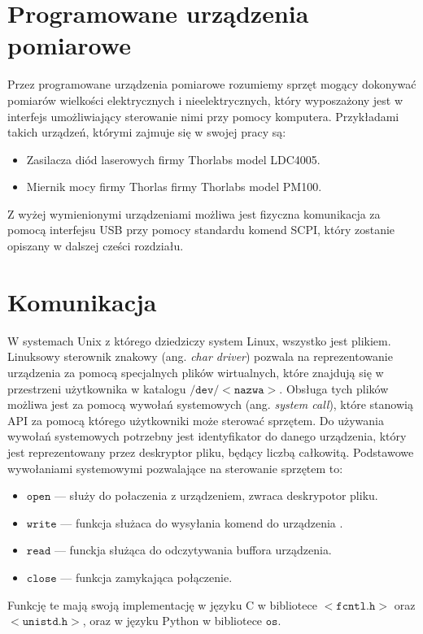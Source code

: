 \section{Programowane urządzenia pomiarowe}
Przez programowane urządzenia pomiarowe rozumiemy sprzęt mogący dokonywać pomiarów wielkości elektrycznych i nieelektrycznych,
który wyposzażony jest w interfejs umożliwiający sterowanie nimi przy pomocy komputera. Przykładami takich urządzeń, którymi zajmuje się w swojej pracy są:
\begin{itemize}
\item Zasilacza diód laserowych firmy Thorlabs model LDC4005.
\item Miernik mocy firmy Thorlas firmy Thorlabs model PM100.
\end{itemize}
Z wyżej wymienionymi urządzeniami możliwa jest fizyczna komunikacja za pomocą interfejsu USB przy pomocy standardu komend SCPI,
który zostanie opiszany w dalszej cześci rozdziału.

\section{Komunikacja}
W systemach Unix z którego dziedziczy system Linux, wszystko jest plikiem. Linuksowy sterownik znakowy (ang. \textit{char driver})
pozwala na reprezentowanie urządzenia za pomocą specjalnych plików wirtualnych, które znajdują się w przestrzeni
użytkownika w katalogu $\mathtt{/dev/<nazwa>}$. Obsługa tych plików możliwa jest za pomocą wywołań systemowych (ang. \textit{system call}),
które stanowią API za pomocą którego użytkowniki może sterować sprzętem. Do używania wywołań systemowych potrzebny jest
identyfikator do danego urządzenia, który jest reprezentowany przez deskryptor pliku, będący liczbą całkowitą.
Podstawowe wywołaniami systemowymi pozwalające na sterowanie sprzętem to:
\begin{itemize}
\item $\mathtt{open}$ --- służy do połaczenia z urządzeniem, zwraca deskrypotor pliku.
\item $\mathtt{write}$ --- funkcja służaca do wysyłania komend do urządzenia .
\item $\mathtt{read}$ --- funckja służąca do odczytywania buffora urządzenia.
\item $\mathtt{close}$ --- funkcja zamykająca połączenie.
\end{itemize}
Funkcję te mają swoją implementację w języku C w bibliotece $<\mathtt{fcntl.h}>$ oraz $<\mathtt{unistd.h}>$, oraz w języku Python w bibliotece $\mathtt{os}$.
